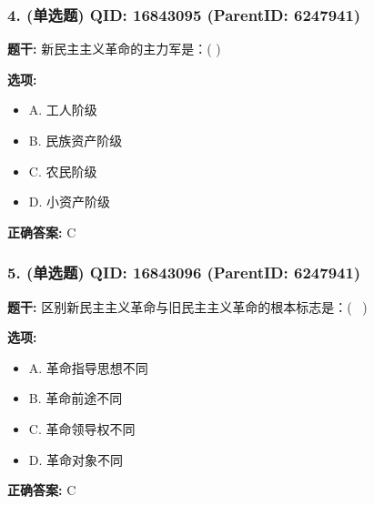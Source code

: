 \documentclass[12pt,UTF8]{ctexart}
\begin{document}
\vspace{0.3em}\hrulefill\vspace{0.7em}

\subsubsection*{4. (单选题) \small QID: 16843095 (ParentID: 6247941)}

\textbf{题干:}
新民主主义革命的主力军是：( )



\textbf{选项:}
\begin{itemize}[leftmargin=*]

  \item A. 工人阶级

  \item B. 民族资产阶级

  \item C. 农民阶级

  \item D. 小资产阶级

\end{itemize}

\textbf{正确答案:}
C

\vspace{0.3em}\hrulefill\vspace{0.7em}

\subsubsection*{5. (单选题) \small QID: 16843096 (ParentID: 6247941)}

\textbf{题干:}
区别新民主主义革命与旧民主主义革命的根本标志是：(  )



\textbf{选项:}
\begin{itemize}[leftmargin=*]

  \item A. 革命指导思想不同

  \item B. 革命前途不同

  \item C. 革命领导权不同

  \item D. 革命对象不同

\end{itemize}

\textbf{正确答案:}
C

\vspace{0.3em}\hrulefill\vspace{0.7em}
\end{document}
